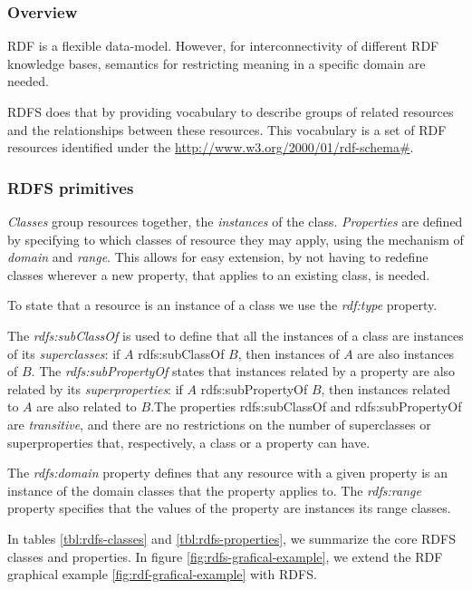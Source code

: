 \subsubsection{Overview}

\gls{RDF} is a flexible data-model. However, for interconnectivity of different \gls{RDF} knowledge bases, semantics for restricting meaning in a specific domain are needed.

\gls{RDFS} \autocite{W3c_undated-mp} does that by providing vocabulary to describe groups of related resources and the relationships between these resources. This vocabulary is a set of \gls{RDF} resources identified under the \url{http://www.w3.org/2000/01/rdf-schema#}{}.

\subsubsection{RDFS primitives}

\emph{Classes} group resources together, the \emph{instances} of the class. \emph{Properties} are defined by specifying to which classes of resource they may apply, using the mechanism of \emph{domain} and \emph{range}. This allows for easy extension, by not having to redefine classes wherever a new property, that applies to an existing class, is needed.

To state that a resource is an instance of a class we use the \emph{rdf:type} property.

The \emph{rdfs:subClassOf} is used to define that all the instances of a class are instances of its \emph{superclasses}: if $A$ rdfs:subClassOf $B$, then instances of $A$ are also instances of $B$. The \emph{rdfs:subPropertyOf} states that instances related by a property are also related by its \emph{superproperties}: if $A$ rdfs:subPropertyOf $B$, then instances related to $A$ are also related to $B$.The properties rdfs:subClassOf and rdfs:subPropertyOf are \emph{transitive}, and there are no restrictions on the number of superclasses or superproperties that, respectively, a class or a property can have.

The \emph{rdfs:domain} property defines that any resource with a given property is an instance of the domain classes that the property applies to. The \emph{rdfs:range} property specifies that the values of the property are instances its range classes.

In tables \ref{tbl:rdfs-classes} and \ref{tbl:rdfs-properties}, we summarize the core \gls{RDFS} classes and properties. In figure \ref{fig:rdfs-grafical-example}, we extend the \gls{RDF} graphical example \ref{fig:rdf-grafical-example} with \gls{RDFS}.


